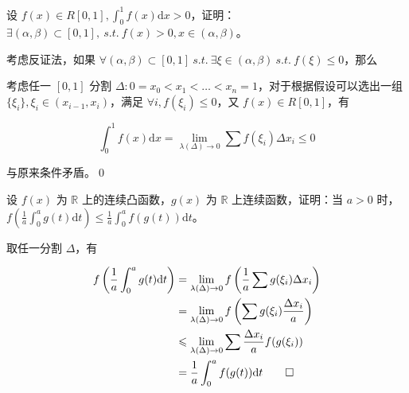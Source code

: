 \begin{ques}
设 $\displaystyle f( x) \in R[ 0,1] ,\int _{0}^{1} f( x)\mathrm{d} x >0$，证明：$\displaystyle \exists ( \alpha ,\beta ) \subset [ 0,1] ,\ s.t.\ f( x)  >0,x\in ( \alpha ,\beta )$。

\end{ques}


考虑反证法，如果 $\displaystyle \forall ( \alpha ,\beta ) \subset [ 0,1] \ s.t.\ \exists \xi \in ( \alpha ,\beta ) \ s.t.\ f( \xi ) \leqslant 0$，那么

考虑任一 $\displaystyle [ 0,1]$ 分割 $\displaystyle \Delta :0=x_{0} < x_{1} < \dotsc < x_{n} =1$，对于根据假设可以选出一组 $\displaystyle \{\xi _{i}\} ,\xi _{i} \in ( x_{i-1} ,x_{i})$，满足 $\displaystyle \forall i,f( \xi _{i}) \leqslant 0$，又 $\displaystyle f( x) \in R[ 0,1]$，有


\begin{equation*}
	\int _{0}^{1} f( x)\mathrm{d} x=\lim _{\lambda ( \Delta )\rightarrow 0}\sum f( \xi _{i}) \Delta x_{i} \leqslant 0
\end{equation*}


与原来条件矛盾。\qed 



\begin{ques}
设 $\displaystyle f( x)$ 为 $\displaystyle \mathbb{R}$ 上的连续凸函数，$\displaystyle g( x)$ 为 $\displaystyle \mathbb{R}$ 上连续函数，证明：当 $\displaystyle a >0$ 时，$\displaystyle f\left(\frac{1}{a}\int _{0}^{a} g( t)\mathrm{d} t\right) \leqslant \frac{1}{a}\int _{0}^{a} f( g( t))\mathrm{d} t$。

\end{ques}


取任一分割 $\displaystyle \Delta $，有




\begin{equation*}
	\begin{aligned}
		f\left(\frac{1}{a}\int _{0}^{a} g( t)\mathrm{d} t\right) & =\lim _{\lambda ( \Delta )\rightarrow 0} f\left(\frac{1}{a}\sum g( \xi _{i}) \Delta x_{i}\right)\\
		& =\lim _{\lambda ( \Delta )\rightarrow 0} f\left(\sum g( \xi _{i})\frac{\Delta x_{i}}{a}\right)\\
		& \leqslant \lim _{\lambda ( \Delta )\rightarrow 0}\sum \frac{\Delta x_{i}}{a} f( g( \xi _{i}))\\
		& =\frac{1}{a}\int _{0}^{a} f( g( t))\mathrm{d} t \qed
	\end{aligned} 
\end{equation*}





\ifx\allfiles\undefined

\fi